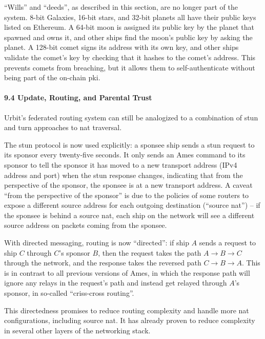 \documentclass[twoside]{article}
\begin{document}
``Wills'' and ``deeds'', as described in this section, are no longer part of the system.  8-bit Galaxies, 16-bit stars, and 32-bit planets all have their public keys listed on Ethereum.  A 64-bit moon is assigned its public key by the planet that spawned and owns it, and other ships find the moon's public key by asking the planet.  A 128-bit comet signs its address with its own key, and other ships validate the comet's key by checking that it hashes to the comet's address.  This prevents comets from breaching, but it allows them to self-authenticate without being part of the on-chain {\sc pki}.

\paragraph{9.4 Update, Routing, and Parental Trust}

Urbit's federated routing system can still be analogized to a combination of {\sc stun} and {\sc turn} approaches to {\sc nat} traversal.

The {\sc stun} protocol is now used explicitly: a sponsee ship sends a {\sc stun} request to its sponsor every twenty-five seconds.  It only sends an Ames command to its sponsor to tell the sponsor it has moved to a new transport address (IPv4 address and port) when the {\sc stun} response changes, indicating that from the perspective of the sponsor, the sponsee is at a new transport address.  A caveat ``from the perspective of the sponsor'' is due to the policies of some routers to expose a different source address for each outgoing destination (``source {\sc nat}'') – if the sponsee is behind a source {\sc nat}, each ship on the network will see a different source address on packets coming from the sponsee.

With directed messaging, routing is now ``directed'': if ship $A$ sends a request to ship $C$ through $C$'s sponsor $B$, then the request takes the path $A \rightarrow B \rightarrow C$ through the network, and the response takes the reversed path $C \rightarrow B \rightarrow A$.  This is in contrast to all previous versions of Ames, in which the response path will ignore any relays in the request's path and instead get relayed through $A$'s sponsor, in so-called ``criss-cross routing''.

This directedness promises to reduce routing complexity and handle more {\sc nat} configurations, including source {\sc nat}.  It has already proven to reduce complexity in several other layers of the networking stack.
\end{document}
